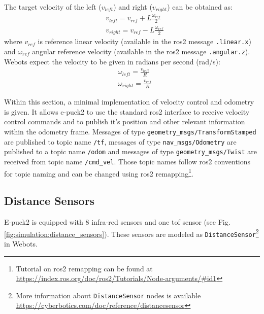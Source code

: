 The target velocity of the left ($v_{left}$) and right ($v_{right}$) can be obtained as:
\begin{equation}
\begin{aligned}
    & v_{left} = v_{ref} + L \frac{\omega_{ref}}{2} \\
    & v_{right} = v_{ref} - L \frac{\omega_{ref}}{2}
\end{aligned}
\end{equation}
where $ v_{ref}  $ is reference linear velocity (available in the \ac{ros2} message \texttt{.linear.x}) and $ \omega_{ref} $ angular reference velocity (available in the \ac{ros2} message \texttt{.angular.z}). Webots expect the velocity to be given in radians per second (rad/s):
\begin{equation}
\begin{aligned}
    & \omega_{left} = \frac{v_{left}}{R} \\
    & \omega_{right} = \frac{v_{ref}}{R} 
\end{aligned}
\end{equation}

Within this section, a minimal implementation of velocity control and odometry is given.
It allows e-puck2 to use the standard \ac{ros2} interface to receive velocity control commands and to publish it's position and other relevant information within the odometry frame.
Messages of type \texttt{geometry\_msgs/TransformStamped} are published to topic name \texttt{/tf}, messages of type \texttt{nav\_msgs/Odometry} are published to a topic name \texttt{/odom} and messages of type \texttt{geometry\_msgs/Twist} are received from topic name \texttt{/cmd\_vel}.
Those topic names follow \ac{ros2} conventions for topic naming and can be changed using \ac{ros2} remapping\footnote{Tutorial on \ac{ros2} remapping can be found at \url{https://index.ros.org/doc/ros2/Tutorials/Node-arguments/\#id1}}. 

\subsection{Distance Sensors}
E-puck2 is equipped with 8 infra-red sensors and one \ac{tof} sensor (see Fig. \ref{fig:simulation:distance_sensors}). These sensors are modeled as \texttt{DistanceSensor}\footnote{More information about \texttt{DistanceSensor} nodes is available \url{https://cyberbotics.com/doc/reference/distancesensor}} in Webots.

